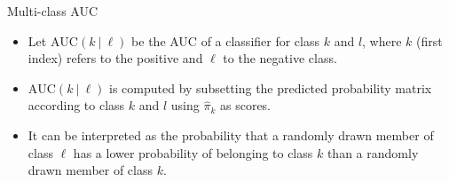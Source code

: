 

\begin{vbframe}{Multi-class AUC}

\begin{itemize}

\item Let $\text{AUC}(k ~|~ \ell)$ be the AUC of a classifier for class $k$ and $l$, where $k$ (first index) refers to the positive and $\ell$ to the negative class.

\item $\text{AUC}(k ~|~ \ell)$ is computed by subsetting the predicted probability matrix according to class $k$ and $l$ using $\hat \pi_k$ as scores.

\item It can be interpreted as the probability that a randomly drawn member of class $\ell$ has a lower probability of belonging to class $k$ than a randomly drawn member of class $k$.

\end{itemize}



\end{vbframe}
